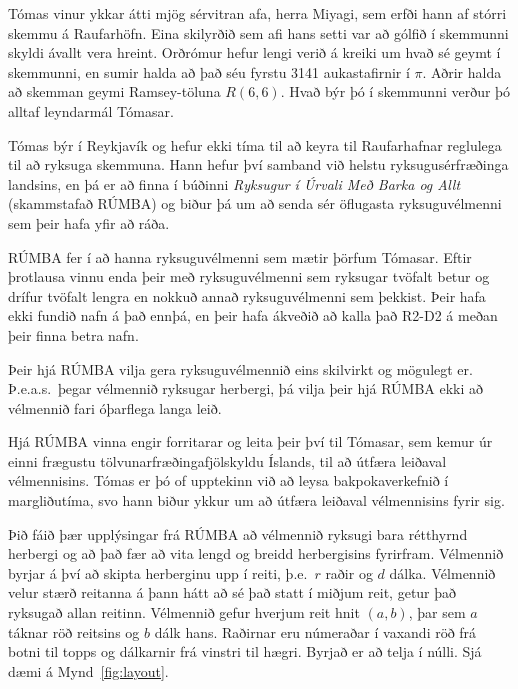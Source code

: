 

Tómas vinur ykkar átti mjög sérvitran afa, herra Miyagi, sem erfði hann af
stórri skemmu á Raufarhöfn. Eina skilyrðið sem afi hans setti var að gólfið í
skemmunni skyldi ávallt vera hreint. Orðrómur hefur lengi verið á kreiki um
hvað sé geymt í skemmunni, en sumir halda að það séu fyrstu 3141 aukastafirnir
í $\pi$. Aðrir halda að skemman geymi Ramsey-töluna $R(6,6)$. Hvað býr þó í
skemmunni verður þó alltaf leyndarmál Tómasar.

Tómas býr í Reykjavík og hefur ekki tíma til að keyra til Raufarhafnar
reglulega til að ryksuga skemmuna. Hann hefur því samband við helstu
ryksugusérfræðinga landsins, en þá er að finna í búðinni \emph{Ryksugur í Úrvali
Með Barka og Allt} (skammstafað RÚMBA) og biður þá um að senda sér öflugasta
ryksuguvélmenni sem þeir hafa yfir að ráða.

RÚMBA fer í að hanna ryksuguvélmenni sem mætir þörfum Tómasar. Eftir þrotlausa
vinnu enda þeir með ryksuguvélmenni sem ryksugar tvöfalt betur og drífur
tvöfalt lengra en nokkuð annað ryksuguvélmenni sem þekkist. Þeir hafa ekki
fundið nafn á það ennþá, en þeir hafa ákveðið að kalla það R2-D2 á meðan þeir
finna betra nafn.

Þeir hjá RÚMBA vilja gera ryksuguvélmennið eins skilvirkt og mögulegt er.
Þ.e.a.s.\ þegar vélmennið ryksugar herbergi, þá vilja þeir hjá RÚMBA ekki að
vélmennið fari óþarflega langa leið.

Hjá RÚMBA vinna engir forritarar og leita þeir því til Tómasar, sem kemur úr
einni frægustu tölvunarfræðingafjölskyldu Íslands, til að útfæra leiðaval
vélmennisins. Tómas er þó of upptekinn við að leysa bakpokaverkefnið í
margliðutíma, svo hann biður ykkur um að útfæra leiðaval vélmennisins fyrir
sig.

Þið fáið þær upplýsingar frá RÚMBA að vélmennið ryksugi bara rétthyrnd herbergi
og að það fær að vita lengd og breidd herbergisins fyrirfram. Vélmennið byrjar
á því að skipta herberginu upp í reiti, þ.e.\ $r$ raðir og $d$ dálka. Vélmennið
velur stærð reitanna á þann hátt að sé það statt í miðjum reit, getur það
ryksugað allan reitinn. Vélmennið gefur hverjum reit hnit $(a,b)$, þar sem $a$
táknar röð reitsins og $b$ dálk hans. Raðirnar eru númeraðar í vaxandi röð frá
botni til topps og dálkarnir frá vinstri til hægri. Byrjað er að telja í núlli.
Sjá dæmi á Mynd~\ref{fig:layout}.

